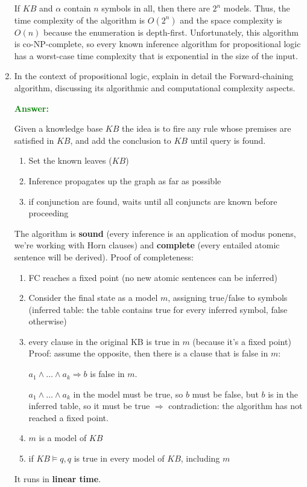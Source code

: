 \documentclass[12pt]{article}
\begin{document}
\begin{enumerate}[label=\textbf{PL.\arabic*}]
    If $KB$ and $\alpha$ contain $n$ symbols in all, then there are $2^n$ models.
    Thus, the time complexity of the algorithm is $O(2^n)$ and the space complexity is $O(n)$ because the enumeration is depth-first.
    Unfortunately, this algorithm is co-NP-complete, so every known inference algorithm for propositional logic has a 
    worst-case time complexity that is exponential in the size of the input.

    \item In the context of propositional logic, explain in detail the Forward-chaining algorithm, discussing its algorithmic and computational complexity aspects.
    
    \textcolor{green}{\textbf{Answer:}}

    Given a knowledge base $KB$ the idea is to fire any rule whose premises are satisfied in $KB$, and add the conclusion to $KB$ until query is found.
    \begin{enumerate}[label=\roman*.]
        \item Set the known leaves ($KB$)
        \item Inference propagates up the graph as far as possible
        \item if conjunction are found, waits until all conjuncts are known before proceeding
    \end{enumerate}

    The algorithm is \textbf{sound} (every inference is an application of modus ponens, we're working with Horn clauses)
    and \textbf{complete} (every entailed atomic sentence will be derived).
    Proof of completeness:
    \begin{enumerate}
        \item FC reaches a fixed point (no new atomic sentences can be inferred)
        \item Consider the final state as a model $m$, assigning true/false to symbols (inferred table: the table contains true for every inferred symbol, false otherwise)
        \item every clause in the original KB is true in $m$ (because it's a fixed point)
        Proof: assume the opposite, then there is a clause that is false in $m$: 
        
        $a_1\land\ldots\land a_k\Rightarrow b$ is false in $m$.
        
        $a_1\land\ldots\land a_k$ in the model must be true, so $b$ must be false, but $b$ is in the inferred table, 
        so it must be true $\Rightarrow$ contradiction: the algorithm has not reached a fixed point.
        \item $m$ is a model of $KB$
        \item if $KB\vDash q,q$ is true in every model of $KB$, including $m$
    \end{enumerate}
    It runs in \textbf{linear time}.


\end{enumerate}
\end{document}
